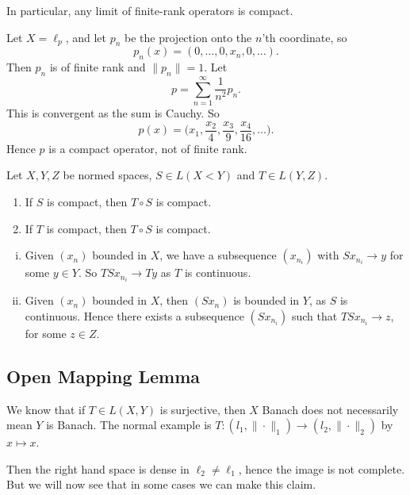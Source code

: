 \documentclass[12pt]{article}
\begin{document}
In particular, any limit of finite-rank operators is compact.

\begin{exbox}
	Let $X = \ell_p$, and let $p_n$ be the projection onto the $n$'th coordinate, so
	\[
	p_n(x) = (0, \ldots, 0, x_n, 0, \ldots).
	\]
	Then $p_n$ is of finite rank and $\|p_n\| = 1$. Let
	\[
	p = \sum_{n = 1}^{\infty} \frac{1}{n^2} p_n.
	\]
	This is convergent as the sum is Cauchy. So
	\[
	p(x) = \biggl(x_1, \frac{x_2}{4}, \frac{x_3}{9}, \frac{x_4}{16}, \ldots\biggr).
	\]
	Hence $p$ is a compact operator, not of finite rank.
\end{exbox}

\begin{proposition}
	Let $X, Y, Z$ be normed spaces, $S \in L(X< Y)$ and $T \in L(Y, Z)$.
	\begin{enumerate}[\normalfont(i)]
		\item If $S$ is compact, then $T \circ S$ is compact.
		\item If $T$ is compact, then $T \circ S$ is compact.
	\end{enumerate}
\end{proposition}

\begin{proofbox}
	\begin{enumerate}[(i)]
		\item Given $(x_n)$ bounded in $X$, we have a subsequence $(x_{n_i})$ with $S x_{n_i} \to y$ for some $y \in Y$. So $TS x_{n_i} \to Ty$ as $T$ is continuous.
		\item Given $(x_n)$ bounded in $X$, then $(Sx_n)$ is bounded in $Y$, as $S$ is continuous. Hence there exists a subsequence $(S x_{n_i})$ such that $T S x_{n_i} \to z$, for some $z \in Z$.
	\end{enumerate}
\end{proofbox}

\subsection{Open Mapping Lemma}
\label{sub:ops_lemma}

We know that if $T \in L(X, Y)$ is surjective, then $X$ Banach does not necessarily mean $Y$ is Banach. The normal example is $T : (l_1, \|\cdot\|_1) \to (l_2, \|\cdot\|_2)$ by $x \mapsto x$.

Then the right hand space is dense in $\ell_2 \neq \ell_1$, hence the image is not complete. But we will now see that in some cases we can make this claim.
\end{document}
